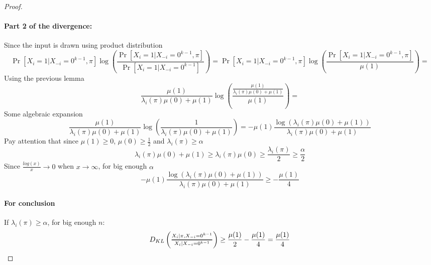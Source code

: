 \begin{proof}
\paragraph{Part 2 of the divergence:}
Since the input is drawn using product distribution
\begin{equation*}
    \Pr[X_i = 1 | X_{-i}=0^{k-1}, \pi]\log\left(\frac{\Pr[X_i = 1 | X_{-i}=0^{k-1}, \pi]}{\Pr[X_i = 1 | X_{-i}=0^{k-1}]}\right) = \Pr[X_i = 1 | X_{-i}=0^{k-1}, \pi]\log\left(\frac{\Pr[X_i = 1 | X_{-i}=0^{k-1}, \pi]}{\mu(1)}\right) = 
\end{equation*}
Using the previous lemma
\begin{equation*}
    \frac{\mu(1)}{\lambda_i(\pi)\mu(0) + \mu(1)}\log\left(\frac{\frac{\mu(1)}{\lambda_i(\pi)\mu(0) + \mu(1)}}{\mu(1)}\right) = 
\end{equation*}
Some algebraic expansion
\begin{equation*}
    \frac{\mu(1)}{\lambda_i(\pi)\mu(0) + \mu(1)}\log\left(\frac{1}{\lambda_i(\pi)\mu(0) + \mu(1)}\right) = -\mu(1) \frac{\log(\lambda_i(\pi)\mu(0) + \mu(1))}{\lambda_i(\pi)\mu(0) + \mu(1)}
\end{equation*}
Pay attention that since $ \mu(1) \geq 0$, $\mu(0) \geq \frac{1}{2}$ and $\lambda_i(\pi) \geq \alpha$
\begin{equation*}
    \lambda_i(\pi)\mu(0) + \mu(1) \geq \lambda_i(\pi)\mu(0) \geq \frac{\lambda_i(\pi)}{2} \geq \frac{\alpha}{2}
\end{equation*}
Since $\frac{log(x)}{x} \rightarrow 0$ when $x \rightarrow \infty$, for big enough $\alpha$
\begin{equation*}
    -\mu(1) \frac{\log(\lambda_i(\pi)\mu(0) + \mu(1))}{\lambda_i(\pi)\mu(0) + \mu(1)} \geq -\frac{\mu(1)}{4}
\end{equation*}
\paragraph{For conclusion}
If $\lambda_i(\pi) \geq \alpha$, for big enough $n$:
\begin{equation*}
     D_{KL}\left(\Dfrac{X_i | \pi, X_{-i} = 0^{k-1}}{X_i | X_{-i} = 0^{k-1}} \right) \geq \frac{\mu(1)}{2} -\frac{\mu(1)}{4} = \frac{\mu(1)}{4}
\end{equation*}
\end{proof}


